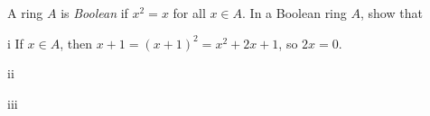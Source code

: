 \begin{exercise}
A ring \(A\) is \emph{Boolean} if \(x^2 = x\) for all \(x \in A\).
In a Boolean ring \(A\), show that
\end{exercise}

\begin{partsolution}{i}
If \(x \in A\), then \(x + 1 = \left(x + 1\right)^2 = x^2 + 2 x + 1\), so \(2 x = 0\).
\end{partsolution}

\begin{partsolution}{ii}

\end{partsolution}

\begin{partsolution}{iii}

\end{partsolution}